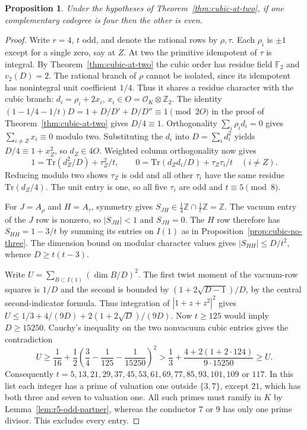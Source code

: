 \documentclass[11pt,a4paper]{article}
\newtheorem{proposition}[theorem]{Proposition}
\numberwithin{equation}{section}
\begin{document}
\begin{proposition}\label{prop:cubic-four-odd}
Under the hypotheses of Theorem~\ref{thm:cubic-at-two}, if one complementary codegree is four then the other is even.
\end{proposition}
\begin{proof}
Write $r=4$, $t$ odd, and denote the rational rows by $\rho,\tau$. Each $\rho_i$ is $\pm1$ except for a single zero, say at $Z$. At two the primitive idempotent of $\tau$ is integral. By Theorem~\ref{thm:cubic-at-two} the cubic order has residue field $\mathbb F_2$ and $v_2(D)=2$. The rational branch of $\rho$ cannot be isolated, since its idempotent has nonintegral unit coefficient $1/4$. Thus it shares a residue character with the cubic branch: $d_i=\rho_i+2x_i$, $x_i\in O=\mathcal O_K\otimes\mathbb Z_2$. The identity $(1-1/4-1/t)D=1+D/D'+D/D''\equiv1\pmod{2O}$ in the proof of Theorem~\ref{thm:cubic-at-two} gives $D/4\equiv1$. Orthogonality $\sum_i\rho_i d_i=0$ gives $\sum_{i\ne Z} x_i\equiv0$ modulo two. Substituting the $d_i$ into $D=\sum_i d_i^2$ yields $D/4\equiv1+x_Z^2$, so $d_Z\in4O$. Weighted column orthogonality now gives
\[
 1=\mathrm{Tr}(d_Z^2/D)+\tau_Z^2/t,\qquad
 0=\mathrm{Tr}(d_Zd_i/D)+\tau_Z\tau_i/t\quad(i\ne Z).
\]
Reducing modulo two shows $\tau_Z$ is odd and all other $\tau_i$ have the same residue $\mathrm{Tr}(d_Z/4)$. The unit entry is one, so all five $\tau_i$ are odd and $t\equiv5\pmod8$.

For $J=A_\rho$ and $H=A_\tau$, symmetry gives $S_{JH}\in\tfrac14\mathbb Z\cap\tfrac1t\mathbb Z=\mathbb Z$. The vacuum entry of the $J$ row is nonzero, so $|S_{JH}|<1$ and $S_{JH}=0$. The $H$ row therefore has $S_{HH}=1-3/t$ by summing its entries on $I(1)$ as in Proposition~\ref{prop:cubic-no-three}. The dimension bound on modular character values gives $|S_{HH}|\le D/t^2$, whence $D\ge t(t-3)$.

Write $U=\sum_{B\subset I(1)}(\dim B/D)^2$. The first twist moment of the vacuum-row squares is $1/D$ and the second is bounded by $(1+2\sqrt{D-1})/D$, by the central second-indicator formula. Thus integration of $|1+z+z^2|^2$ gives $U\le1/3+4/(9D)+2(1+2\sqrt{D})/(9D)$. Now $t\ge125$ would imply $D\ge15250$. Cauchy's inequality on the two nonvacuum cubic entries gives the contradiction
\[
 U\ge\frac1{16}+\frac12\left(\frac34-\frac1{125}-\frac1{15250}\right)^2
  >\frac13+\frac{4+2(1+2\cdot124)}{9\cdot15250}\ge U.
\]
Consequently $t=5,13,21,29,37,45,53,61,69,77,85,93,101,109$ or $117$. In this list each integer has a prime of valuation one outside $\{3,7\}$, except $21$, which has both three and seven to valuation one. All such primes must ramify in $K$ by Lemma~\ref{lem:r5-odd-partner}, whereas the conductor $7$ or $9$ has only one prime divisor. This excludes every entry.
\end{proof}
\end{document}
